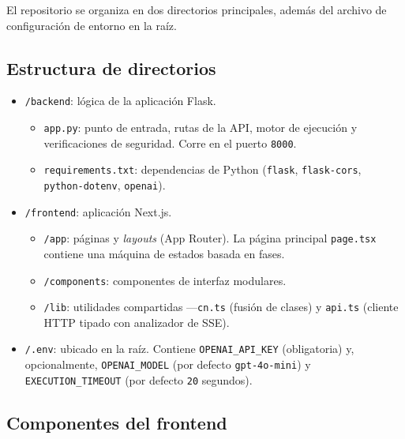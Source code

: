 \documentclass[12pt,a4paper]{article}
\begin{document}
El repositorio se organiza en dos directorios principales, además del archivo de
configuración de entorno en la raíz.

\subsection{Estructura de directorios}

\begin{itemize}
    \item \texttt{/backend}: lógica de la aplicación Flask.
    \begin{itemize}
        \item \texttt{app.py}: punto de entrada, rutas de la API, motor de
        ejecución y verificaciones de seguridad. Corre en el puerto
        \texttt{8000}.
        \item \texttt{requirements.txt}: dependencias de Python
        (\texttt{flask}, \texttt{flask-cors}, \texttt{python-dotenv},
        \texttt{openai}).
    \end{itemize}
    \item \texttt{/frontend}: aplicación Next.js.
    \begin{itemize}
        \item \texttt{/app}: páginas y \textit{layouts} (App Router). La página
        principal \texttt{page.tsx} contiene una máquina de estados basada en
        fases.
        \item \texttt{/components}: componentes de interfaz modulares.
        \item \texttt{/lib}: utilidades compartidas —\texttt{cn.ts} (fusión de
        clases) y \texttt{api.ts} (cliente HTTP tipado con analizador de SSE).
    \end{itemize}
    \item \texttt{/.env}: ubicado en la raíz. Contiene \texttt{OPENAI\_API\_KEY}
    (obligatoria) y, opcionalmente, \texttt{OPENAI\_MODEL} (por defecto
    \texttt{gpt-4o-mini}) y \texttt{EXECUTION\_TIMEOUT} (por defecto
    \texttt{20} segundos).
\end{itemize}

\subsection{Componentes del frontend}
\end{document}

